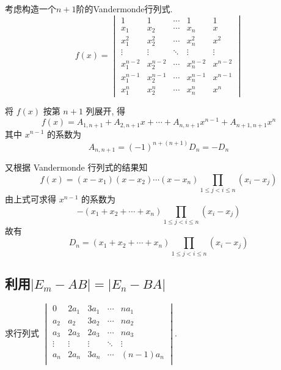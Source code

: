 \begin{solution}
    考虑构造一个$n+1$阶的Vandermonde行列式.
    \[ f(x)=\begin{vmatrix}
            1         & 1         & \cdots & 1         & 1       \\
            x_1       & x_2       & \cdots & x_n       & x       \\
            x_1^{2}   & x_2^{2}   & \cdots & x_n^{2}   & x^{2}   \\
            \vdots    & \vdots    & \ddots & \vdots    & \vdots  \\
            x_1^{n-2} & x_2^{n-2} & \cdots & x_n^{n-2} & x^{n-2} \\
            x_1^{n-1} & x_2^{n-1} & \cdots & x_n^{n-1} & x^{n-1} \\
            x_1^{n}   & x_2^{n}   & \cdots & x_n^{n}   & x^{n}
        \end{vmatrix} \]

    将 $f(x)$ 按第 $n+1$ 列展开, 得
    \[ f(x)=A_{1, n+1}+A_{2, n+1} x+\cdots+A_{n, n+1} x^{n-1}+A_{n+1, n+1} x^{n} \]
    其中 $x^{n-1}$ 的系数为
    \[ A_{n, n+1}=(-1)^{n+(n+1)} D_n=-D_n \]

    又根据 Vandermonde 行列式的结果知
    \[ f(x)=(x-x_1)(x-x_2)\cdots(x-x_n) \prod_{1 \leqslant j<i \leqslant n}(x_i-x_j) \]
    由上式可求得 $x^{n-1}$ 的系数为
    \[ -(x_1+x_2+\cdots+x_n) \prod_{1 \leqslant j<i \leqslant n}(x_i-x_j) \]
    故有
    \[ D_n=(x_1+x_2+\cdots+x_n) \prod_{1 \leqslant j<i \leqslant n}(x_i-x_j) \]
\end{solution}

\subsection{利用$|E_m-AB|=|E_n-BA|$} \label{sec:利用|E_m-AB|=|E_n-BA|}

\begin{example}{}{}
    求行列式 $\begin{vmatrix}
            0      & 2a_1   & 3a_1   & \cdots & na_1     \\
            a_2    & a_2    & 3a_2   & \cdots & na_2     \\
            a_3    & 2a_3   & 2a_3   & \cdots & na_3     \\
            \vdots & \vdots & \vdots & \ddots & \vdots   \\
            a_n    & 2a_n   & 3a_n   & \cdots & (n-1)a_n \\
        \end{vmatrix}$.
\end{example}

